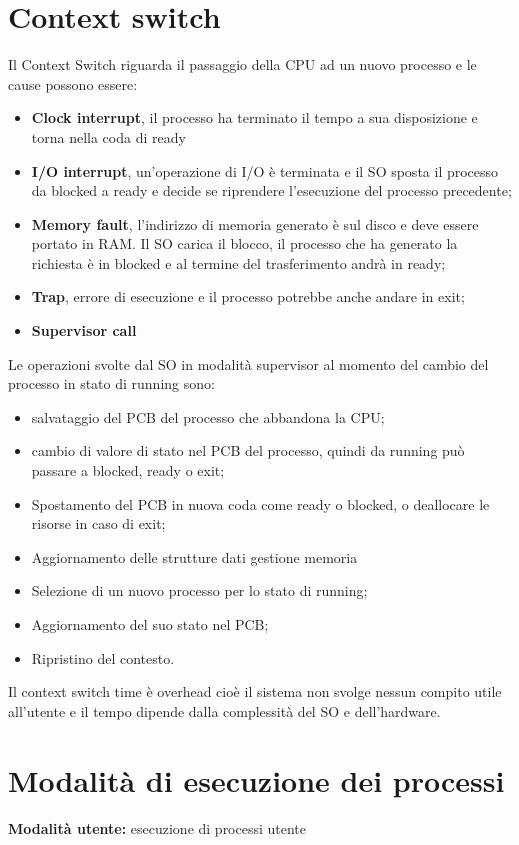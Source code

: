\documentclass[12pt, letterpaper]{report}
\begin{document}
	\section{Context switch}
	Il Context Switch riguarda il passaggio della CPU ad un nuovo processo e le cause possono essere:
	\begin{itemize}
		\item \textbf{Clock interrupt}, il processo ha terminato il tempo a sua disposizione e torna nella coda di ready
		\item \textbf{I/O interrupt}, un'operazione di I/O è terminata e il SO sposta il processo da blocked a ready e decide se riprendere l'esecuzione del processo precedente;
		\item \textbf{Memory fault}, l'indirizzo di memoria generato è sul disco e deve essere portato in RAM. Il SO carica il blocco, il processo che ha generato la richiesta è in blocked e al termine del trasferimento andrà in ready;
		\item \textbf{Trap}, errore di esecuzione e il processo potrebbe anche andare in exit;
		\item \textbf{Supervisor call}
	\end{itemize}
	Le operazioni svolte dal SO in modalità supervisor al momento del cambio del processo in stato di running sono:
	\begin{itemize}
		\item salvataggio del PCB del processo che abbandona la CPU;
		\item cambio di valore di stato nel PCB del processo, quindi da running può passare a blocked, ready o exit;
		\item Spostamento del PCB in nuova coda come ready o blocked, o deallocare le risorse in caso di exit;
		\item Aggiornamento delle strutture dati gestione memoria
		\item Selezione di un nuovo processo per lo stato di running;
		\item Aggiornamento del suo stato nel PCB;
		\item Ripristino del contesto.
	\end{itemize}
	Il context switch time è overhead cioè il sistema non svolge nessun compito utile all'utente e il tempo dipende dalla complessità del SO e dell'hardware.
	\section{Modalità di esecuzione dei processi}
	\noindent
	\textbf{Modalità utente:} esecuzione di processi utente
\end{document}
